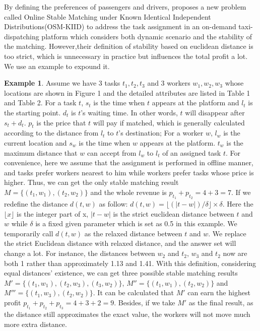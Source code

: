\documentclass[color,twoside,amssymb,twocolumn]{article}
\begin{document}
By defining the preferences of passengers and drivers, \cite{zhao2019preference} proposes a new problem called Online Stable Matching under Known Identical Independent Distributions(OSM-KIID) to address the task assignment in an on-demand taxi-dispatching platform which considers both dynamic scenario and the stability of the matching. However,their definition of stability based on euclidean distance is too strict, which is unnecessary in practice but influences the total profit a lot. We use an example to expound it. 

\textbf{Example 1}. Assume we have 3 tasks $t_1,t_2,t_3$ and 3 workers $w_1,w_2,w_3$  whose locations are shown in Figure 1 and the detailed attributes are listed in Table 1 and Table 2. 
For a task $t$, $s_t$ is the time when $t$ appears at the platform and $l_t$ is the starting point.
$d_t$ is $t$'s waiting time. 
In other words, $t$ will disappear after $s_t+d_t$. 
$p_t$ is the price that $t$ will pay if matched, which is generally calculated according to the distance from $l_t$ to $t$'s destination; 
For a worker $w$, $l_w$ is the current location and $s_w$ is the time when $w$ appears at the platform.
$t_w$ is the maximum distance that $w$ can accept from $l_w$ to $l_t$ of an assigned task $t$. 
For convenience, here we assume that the assignment is performed in offline manner, and tasks prefer workers nearest to him while workers prefer tasks whose price is higher. 
Thus, we can get the only stable matching result $M=\{(t_1,w_1),(t_2,w_2)\}$ and the whole revenue is $p_{t_1} + p_{t_2} = 4 + 3=7$. {If we redefine the distance $d(t,w)$ as follow: $d(t,w) = \lfloor (|t-w|)/\delta \rfloor \times \delta$. Here the $\lfloor x \rfloor$ is the integer part of x, $|t-w|$ is the strict euclidean distance between $t$ and $w$ while $\delta$ is a fixed given parameter which is set as 0.5 in this example. We temporarily call $d(t,w)$ as the relaxed distance between $t$ and $w$.}
We replace the strict Euclidean distance with relaxed distance, and the answer set will change a lot. For instance, the distances between $w_2$ and $t_2$, $w_3$ and $t_2$ now are both 1 rather than approximately 1.13 and 1.41. With this definition, considering equal distances' existence, we can get three possible stable matching results $M'=\{(t_1,w_1),(t_2,w_3),(t_3,w_2)\}$, $M''=\{(t_1,w_1),(t_2,w_2)\}$ and $M'''=\{(t_1,w_3),(t_2,w_2)\}$.
It can be calculated that $M'$ can earn the highest profit $p_{t_1} + p_{t_2} +  p_{t_3}= 4 + 3+2=9$.
Besides, if we take $M'$ as the final result, as the distance still approximates the exact value, the workers will not move much more extra distance.
\end{document}
